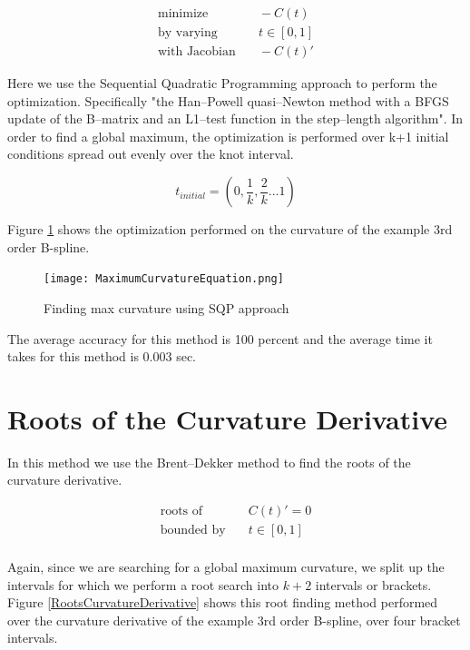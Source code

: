 \documentclass{article}
\begin{document}
\begin{equation}
\begin{aligned}
    \text{minimize} & \quad -C(t) \\
    \text{by varying} & \quad t \in [0,1] \\
    \text{with Jacobian} & \quad -C(t)' 
\end{aligned}
\end{equation}

Here we use the Sequential Quadratic Programming approach to perform the optimization. Specifically "the Han–Powell quasi–Newton method with a BFGS update of the B–matrix and an L1–test function in the step–length algorithm". In order to find a global maximum, the optimization is performed over k+1 initial conditions spread out evenly over the knot interval.

\begin{equation}
    t_{initial} = (0, \frac{1}{k}, \frac{2}{k} ... 1) 
\end{equation}

Figure \ref{Maximum Curvature} shows the optimization performed on the curvature of the example 3rd order B-spline.

\begin{figure}[H]
\centering
\texttt{[image: MaximumCurvatureEquation.png]}
\caption{Finding max curvature using SQP approach}
\label{Maximum Curvature}
\end{figure}

The average accuracy for this method is 100 percent and the average time it takes for this method is 0.003 sec.

\section{Roots of the Curvature Derivative}

In this method we use the Brent–Dekker method to find the roots of the curvature derivative.

\begin{equation}
\begin{aligned}
    \text{roots of} & \quad C(t)' = 0 \\
    \text{bounded by} & \quad t \in [0,1] \\
\end{aligned}
\end{equation}

Again, since we are searching for a global maximum curvature, we split up the intervals for which we perform a root search into \(k + 2\) intervals or brackets. Figure \ref{RootsCurvatureDerivative} shows this root finding method performed over the curvature derivative of the example 3rd order B-spline, over four bracket intervals.
\end{document}
